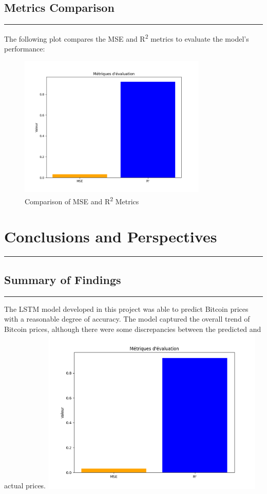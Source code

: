 \documentclass{article}
\begin{document}
\subsection{Metrics Comparison}
\noindent\rule{\textwidth}{1pt} %
The following plot compares the MSE and R\textsuperscript{2} metrics to evaluate the model's performance:
\begin{figure}[h]
    \centering
    \includegraphics[width=0.8\textwidth]{img/metrics_plot.png}
    \caption{Comparison of MSE and R\textsuperscript{2} Metrics} %
    \label{fig:metrics}
\end{figure}

\section{Conclusions and Perspectives}
\noindent\rule{\textwidth}{1pt} %
\subsection{Summary of Findings}
\noindent\rule{\textwidth}{1pt} %
The LSTM model developed in this project was able to predict Bitcoin prices with a reasonable degree of accuracy. The model captured the overall trend of Bitcoin prices, although there were some discrepancies between the predicted and actual prices.
\includegraphics[width=0.8\textwidth]{img/r_carre.png}
\end{document}
